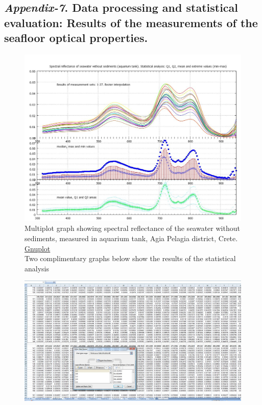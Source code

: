 \documentclass[10pt, a4paper]{article}
\begin{document}
\begin{appendices}
\subsection{\textit{Appendix-7}. Data processing and statistical evaluation: Results of the measurements of the seafloor optical properties.}

\begin{figure}[H]
	\centering
	\includegraphics[scale=0.30]{GNU-21.jpg}
	\caption{Multiplot graph showing spectral reflectance of the seawater without sediments, measured in aquarium tank, Agia Pelagia district, Crete. \href{http://www.gnuplot.info/}{Gnuplot} \\Two complimentary graphs below show the results of the statistical analysis}
	\label{fig:27}
\end{figure}
\begin{figure}[h]
	\begin{center}
		\includegraphics[scale=0.20]{App-1.jpg}

\end{center}
\end{figure}
\end{appendices}
\end{document}
